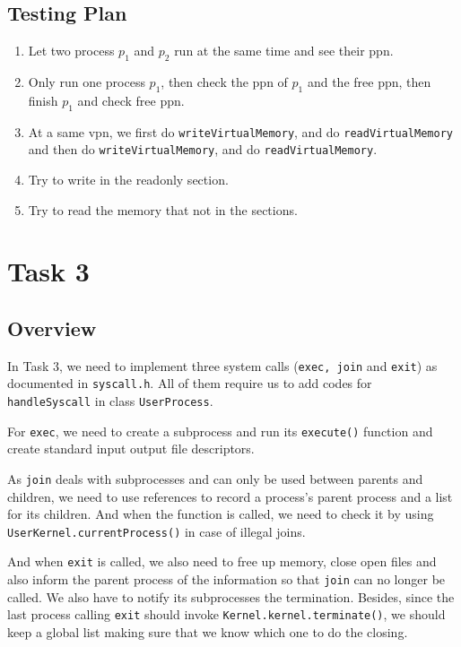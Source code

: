 \documentclass{article}
\begin{document}
\begin{spacing}{1.1}
\subsection{Testing Plan}
\begin{enumerate}[$\bullet$]
  \item Let two process $p_1$ and $p_2$ run at the same time and see
    their ppn.
  \item Only run one process $p_1$, then check the ppn of $p_1$
    and the free ppn, then finish $p_1$ and check free ppn.
  \item At a same vpn, we first do \texttt{writeVirtualMemory},
    and do \texttt{readVirtualMemory} and then do \texttt{writeVirtualMemory},
    and do \texttt{readVirtualMemory}.
  \item Try to write in the readonly section.
  \item Try to read the memory that not in the sections.
\end{enumerate}



\section{Task 3}
\subsection{Overview}
In Task 3, we need to implement three system calls (\texttt{exec, join} and \texttt{exit}) as documented in \texttt{syscall.h}. All of them require us to add codes for \texttt{handleSyscall} in class \texttt{UserProcess}.

For \texttt{exec}, we need to create a subprocess and run its \texttt{execute()} function and create standard input output file descriptors.

As \texttt{join} deals with subprocesses and can only be used between parents and children, we need to use references to record a process's parent process and a list for its children. And when the function is called, we need to check it by using \texttt{UserKernel.currentProcess()} in case of illegal joins.

And when \texttt{exit} is called, we also need to free up memory, close open files and also inform the parent process of the information so that \texttt{join} can no longer be called. We also have to notify its subprocesses the termination. Besides, since the last process calling \texttt{exit} should invoke \texttt{Kernel.kernel.terminate()}, we should keep a global list making sure that we know which one to do the closing.


\end{spacing}
\end{document}
